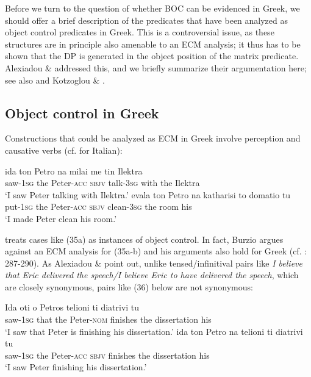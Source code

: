 \documentclass[output=paper]{langsci/langscibook}
\begin{document}
Before we turn to the question of whether BOC can be evidenced in Greek, we should offer a brief description of the predicates that have been analyzed as object control predicates in Greek. This is a controversial issue, as these structures are in principle also amenable to an ECM analysis; it thus has to be shown that the DP is generated in the object position of the matrix predicate. Alexiadou \& \citet{Anagnostopoulou1997} addressed this, and we briefly summarize their argumentation here; see also \citet{Kotzoglou2002} and Kotzoglou \& \citet{Papangeli2007}. 

\subsection{Object control in Greek}%
Constructions that could be analyzed as ECM in Greek involve perception and causative verbs (cf. \citealt{Burzio1986} for Italian):


\ea%
    \label{ex:alexiadou:35}
    \ea \gll ida          ton  Petro         na    milai     me   tin Ilektra\\
             saw{}-\textsc{1sg}  the   Peter{}-\textsc{acc}  \textsc{sbjv} talk-\textsc{3sg} with  the Ilektra\\
    \glt     ‘I saw Peter talking with Ilektra.’
    \ex
    \gll evala      ton Petro       na     katharisi   to   domatio tu\\ 
             put{}-\textsc{1sg}  the Peter{}-\textsc{acc} \textsc{sbjv}   clean-\textsc{3sg}  the  room     his\\
    \glt     ‘I made Peter clean his room.’
    \z
\z    

\citet{Iatridou1993} treats cases like (35a) as instances of object control. In fact, Burzio argues against an ECM analysis for (35a-b) and his arguments also hold for Greek (cf. \citealt{Burzio1986}: 287-290). As Alexiadou \& \citet{Anagnostopoulou1997} point out, unlike tensed/infinitival pairs like \textit{I believe that Eric delivered the speech/I believe Eric to have delivered the speech}, which are closely synonymous, pairs like (36) below are not synonymous:

\ea%
    \label{ex:alexiadou:36}
    \ea
    \gll Ida          oti   o    Petros         telioni   ti      diatrivi       tu\\
             saw{}-\textsc{1sg}  that  the Peter{}-\textsc{nom}   finishes  the  dissertation his\\
    \glt     ‘I saw that Peter is finishing his dissertation.’
    \ex
    \gll ida          ton  Petro      na     telioni   ti    diatrivi        tu\\
             saw{}-\textsc{1sg}  the  Peter{}-\textsc{acc} \textsc{sbjv} finishes the  dissertation his\\
    \glt     ‘I saw Peter finishing his dissertation.’
    \z
\z
\end{document}

